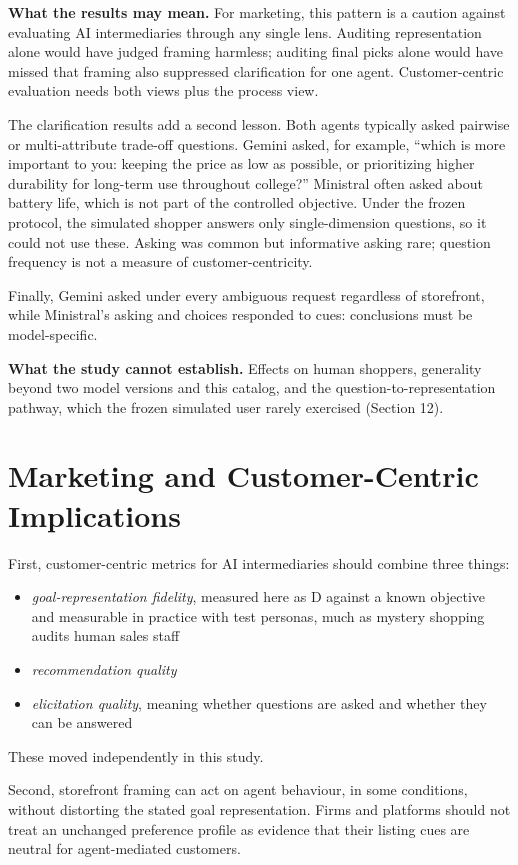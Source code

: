 \documentclass[conference]{IEEEtran}
\begin{document}
\textbf{What the results may mean.} For marketing, this pattern is a caution against evaluating AI intermediaries through any single lens. Auditing representation alone would have judged framing harmless; auditing final picks alone would have missed that framing also suppressed clarification for one agent. Customer-centric evaluation needs both views plus the process view.

The clarification results add a second lesson. Both agents typically asked pairwise or multi-attribute trade-off questions. Gemini asked, for example, ``which is more important to you: keeping the price as low as possible, or prioritizing higher durability for long-term use throughout college?'' Ministral often asked about battery life, which is not part of the controlled objective. Under the frozen protocol, the simulated shopper answers only single-dimension questions, so it could not use these. Asking was common but informative asking rare; question frequency is not a measure of customer-centricity.

Finally, Gemini asked under every ambiguous request regardless of storefront, while Ministral's asking and choices responded to cues: conclusions must be model-specific.

\textbf{What the study cannot establish.} Effects on human shoppers, generality beyond two model versions and this catalog, and the question-to-representation pathway, which the frozen simulated user rarely exercised (Section 12).

\section{Marketing and Customer-Centric Implications}

First, customer-centric metrics for AI intermediaries should combine three things:
\begin{itemize}
\item \emph{goal-representation fidelity}, measured here as D against a known objective and measurable in practice with test personas, much as mystery shopping audits human sales staff
\item \emph{recommendation quality}
\item \emph{elicitation quality}, meaning whether questions are asked and whether they can be answered
\end{itemize}

These moved independently in this study.

Second, storefront framing can act on agent behaviour, in some conditions, without distorting the stated goal representation. Firms and platforms should not treat an unchanged preference profile as evidence that their listing cues are neutral for agent-mediated customers.
\end{document}
